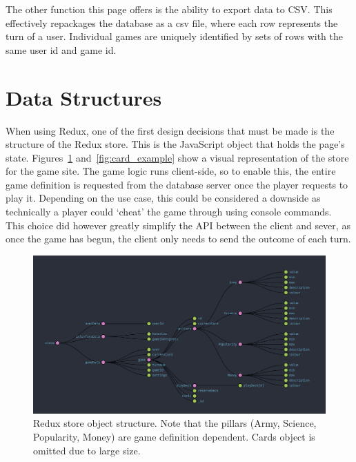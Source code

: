 The other function this page offers is the ability to export data to CSV. This effectively repackages the database as a csv file, where each row represents the turn of a user. Individual games are uniquely identified by sets of rows with the same user id and game id.

\section{Data Structures}
When using Redux, one of the first design decisions that must be made is the structure of the Redux store. This is the JavaScript object that holds the page's state. Figures~\ref{fig:store_shape} and~\ref{fig:card_example} show a visual representation of the store for the game site. The game logic runs client-side, so to enable this, the entire game definition is requested from the database server once the player requests to play it. Depending on the use case, this could be considered a downside as technically a player could `cheat' the game through using console commands. This choice did however greatly simplify the API between the client and sever, as once the game has begun, the client only needs to send the outcome of each turn.

\begin{figure}[!h]
	\centering
	\includegraphics[width=1.0\textwidth]{./images/design/store_shape.png}
	\caption{Redux store object structure. Note that the pillars (Army, Science, Popularity, Money) are game definition dependent. Cards object is omitted due to large size.}
	\label{fig:store_shape}
\end{figure}

